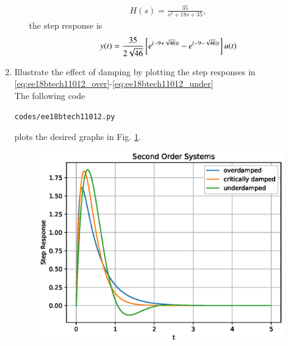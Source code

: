 \begin{enumerate}[label=\thesubsection.\arabic*.,ref=\thesubsection.\theenumi]
\begin{enumerate}
\begin{align}
H(s)=\frac{35}{s^2+18s+35},
\end{align}
the step response is
\begin{equation}
    y(t)=\frac{35}{2\sqrt{46}}{}\left[e^{(-9+\sqrt{46})t}-e^{(-9-\sqrt{46})t}\right]u(t)
\label{eq:ee18btech11012_under}
\end{equation}
\end{enumerate}
\item Illustrate the effect of damping by plotting the step responses in \eqref{eq:ee18btech11012_over}-\eqref{eq:ee18btech11012_under}
\\
\solution The following code
\begin{lstlisting}
codes/ee18btech11012.py
\end{lstlisting}
%
plots the desired graphs in
Fig.     \ref{fig:ee18btech11012}. 
%
\begin{figure}[ht!]
    \includegraphics[width=\columnwidth]{./figs/ee18btech11012.eps}
    \caption{}
    \label{fig:ee18btech11012}
\end{figure}

\end{enumerate}
